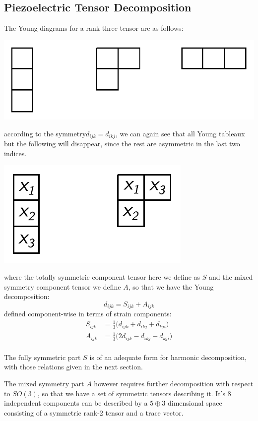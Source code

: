 \documentclass[10pt,a4paper]{article}
\begin{document}
\subsection{Piezoelectric Tensor Decomposition}
The Young diagrams for a rank-three tensor are as follows:
\begin{center}
\includegraphics[scale=0.7]{youngdiagrams3.pdf}
\end{center}
according to the symmetry$d_{ijk}=d_{ikj}$, we can again see that all Young tableaux but the following will disappear, since the rest are asymmetric in the last two indices.
\begin{center}
\includegraphics[scale=0.7]{piezo_young.pdf}
\end{center}
where the totally symmetric component tensor here we define as $S$ and the mixed symmetry component tensor we define $A$, so that we have the Young decomposition:
$$
d_{ijk} = S_{ijk}+A_{ijk}
$$
defined component-wise in terms of strain components:
\begin{align*}
S_{ijk}&=\frac{1}{3}\big(d_{ijk}+d_{ikj}+d_{kji}\big)\\
A_{ijk}&=\frac{1}{3}\big(2d_{ijk}-d_{ikj}-d_{kji}\big)\\
\end{align*}

The fully symmetric part $S$ is of an adequate form for harmonic decomposition, with those relations given in the next section.

The mixed symmetry part $A$ however requires further decomposition with respect to $SO(3)$, so that we have a set of symmetric tensors describing it. It's 8 independent components can be described by a $5\oplus 3$ dimensional space consisting of a symmetric rank-2 tensor and a trace vector.
\end{document}

